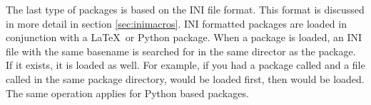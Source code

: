 The last type of packages is based on the INI file format.  This
format is discussed in more detail in section \ref{sec:inimacros}.
INI formatted packages are loaded in conjunction with a \LaTeX\ or
Python package.  When a package is loaded, an INI file with the same
basename is searched for in the same director as the package.  If it
exists, it is loaded as well.  For example, if you had a package
called  and a file called  in the same
package directory,  would be loaded first,
then  would be loaded.  The same operation applies
for Python based packages.
